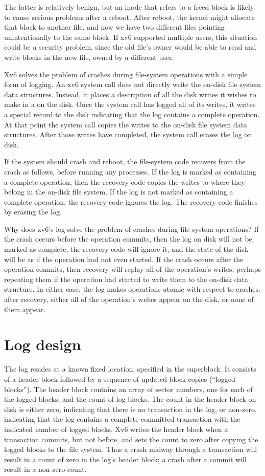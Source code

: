 The latter is relatively benign, but an inode that refers to a freed
block is likely to cause serious problems after a reboot.  After reboot, the
kernel might allocate that block to another file, and now we have two different
files pointing unintentionally to the same block.  If xv6 supported
multiple users, this situation could be a security problem, since the
old file's owner would be able to read and write blocks in the
new file, owned by a different user.

Xv6 solves the problem of crashes during file-system operations with a
simple form of logging. An xv6 system call does not directly write
the on-disk file system data structures. Instead, it places a
description of all the disk writes it wishes to make in a 
on the disk. Once the system call has logged all of its writes, it writes a
special 
record to the disk indicating that the log contains
a complete operation. At that point the system call copies the writes
to the on-disk file system data structures. After those writes have
completed, the system call erases the log on disk.

If the system should crash and reboot, the file-system code recovers
from the crash as follows, before running any processes. If the log is
marked as containing a complete operation, then the recovery code
copies the writes to where they belong in the on-disk file system. If
the log is not marked as containing a complete operation, the recovery
code ignores the log.  The recovery code finishes by erasing
the log.

Why does xv6's log solve the problem of crashes during file system
operations? If the crash occurs before the operation commits, then the
log on disk will not be marked as complete, the recovery code will
ignore it, and the state of the disk will be as if the operation had
not even started. If the crash occurs after the operation commits,
then recovery will replay all of the operation's writes, perhaps
repeating them if the operation had started to write them to the
on-disk data structure. In either case, the log makes operations
atomic with respect to crashes: after recovery, either all of the
operation's writes appear on the disk, or none of them appear.
\section{Log design}

The log resides at a known fixed location, specified in the superblock.
It consists of a header block followed by a sequence
of updated block copies (``logged blocks'').
The header block contains an array of sector
numbers, one for each of the logged blocks, and 
the count of log blocks.
The count in the header block on disk is either
zero, indicating that there is no transaction in the log,
or non-zero, indicating that the log contains a complete committed
transaction with the indicated number of logged blocks.
Xv6 writes the header
block when a transaction commits, but not before, and sets the
count to zero after copying the logged blocks to the file system.
Thus a crash midway through a transaction will result in a
count of zero in the log's header block; a crash after a commit
will result in a non-zero count.

